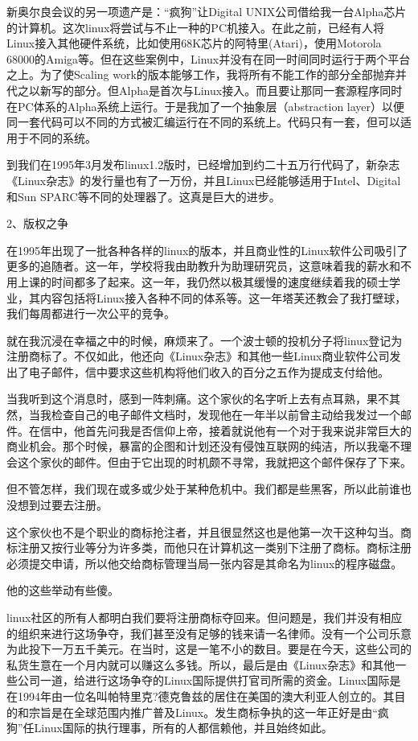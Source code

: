 新奥尔良会议的另一项遗产是：“疯狗”让Digital UNIX公司借给我一台Alpha芯片的计算机。这次linux将尝试与不止一种的PC机接入。在此之前，已经有人将Linux接入其他硬件系统，比如使用68K芯片的阿特里(Atari)，使用Motorola 68000的Amiga等。但在这些案例中，Linux并没有在同一时间同时运行于两个平台之上。为了使Scaling work的版本能够工作，我将所有不能工作的部分全部抛弃并代之以新写的部分。但Alpha是首次与Linux接入。而且要让那同一套源程序同时在PC体系的Alpha系统上运行。于是我加了一个抽象层（abstraction layer）以便同一套代码可以不同的方式被汇编运行在不同的系统上。代码只有一套，但可以适用于不同的系统。

到我们在1995年3月发布linux1.2版时，已经增加到约二十五万行代码了，新杂志《Linux杂志》的发行量也有了一万份，并且Linux已经能够适用于Intel、Digital和Sun SPARC等不同的处理器了。这真是巨大的进步。

 
2、版权之争

在1995年出现了一批各种各样的linux的版本，并且商业性的Linux软件公司吸引了更多的追随者。这一年，学校将我由助教升为助理研究员，这意味着我的薪水和不用上课的时间都多了起来。这一年，我仍然以极其缓慢的速度继续着我的硕士学业，其内容包括将Linux接入各种不同的体系等。这一年塔芙还教会了我打壁球，我们每周都进行一次公平的竞争。

就在我沉浸在幸福之中的时候，麻烦来了。一个波士顿的投机分子将linux登记为注册商标了。不仅如此，他还向《Linux杂志》和其他一些Linux商业软件公司发出了电子邮件，信中要求这些机构将他们收入的百分之五作为提成支付给他。

当我听到这个消息时，感到一阵刺痛。这个家伙的名字听上去有点耳熟，果不其然，当我检查自己的电子邮件文档时，发现他在一年半以前曾主动给我发过一个邮件。在信中，他首先问我是否信仰上帝，接着就说他有一个对于我来说非常巨大的商业机会。那个时候，暴富的企图和计划还没有侵蚀互联网的纯洁，所以我毫不理会这个家伙的邮件。但由于它出现的时机颇不寻常，我就把这个邮件保存了下来。

但不管怎样，我们现在或多或少处于某种危机中。我们都是些黑客，所以此前谁也没想到过要去注册。

这个家伙也不是个职业的商标抢注者，并且很显然这也是他第一次干这种勾当。商标注册又按行业等分为许多类，而他只在计算机这一类别下注册了商标。商标注册必须提交申请，所以他交给商标管理当局一张内容是其命名为linux的程序磁盘。

他的这些举动有些傻。

linux社区的所有人都明白我们要将注册商标夺回来。但问题是，我们并没有相应的组织来进行这场争夺，我们甚至没有足够的钱来请一名律师。没有一个公司乐意为此投下一万五千美元。在当时，这是一笔不小的数目。要是在今天，这些公司的私货生意在一个月内就可以赚这么多钱。所以，最后是由《Linux杂志》和其他一些公司一道，给进行这场争夺的Linux国际提供打官司所需的资金。Linux国际是在1994年由一位名叫帕特里克?德克鲁兹的居住在美国的澳大利亚人创立的。其目的和宗旨是在全球范围内推广普及Linux。发生商标争执的这一年正好是由“疯狗”任Linux国际的执行理事，所有的人都信赖他，并且始终如此。

